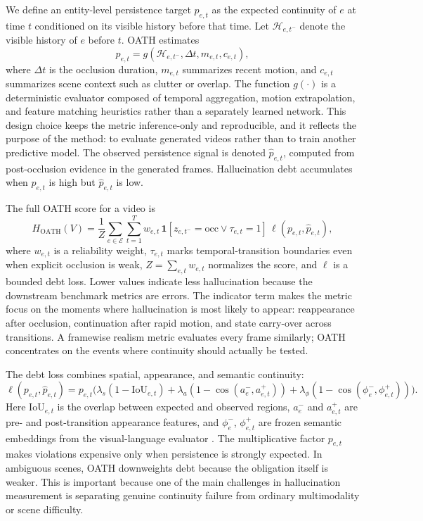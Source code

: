 \documentclass{article}
\begin{document}
We define an entity-level persistence target \(p_{e,t}\) as the expected continuity of \(e\) at time \(t\) conditioned on its visible history before that time. Let \(\mathcal{H}_{e,t^-}\) denote the visible history of \(e\) before \(t\). OATH estimates
\[
p_{e,t}=g(\mathcal{H}_{e,t^-}, \Delta t, m_{e,t}, c_{e,t}),
\]
where \(\Delta t\) is the occlusion duration, \(m_{e,t}\) summarizes recent motion, and \(c_{e,t}\) summarizes scene context such as clutter or overlap. The function \(g(\cdot)\) is a deterministic evaluator composed of temporal aggregation, motion extrapolation, and feature matching heuristics rather than a separately learned network. This design choice keeps the metric inference-only and reproducible, and it reflects the purpose of the method: to evaluate generated videos rather than to train another predictive model. The observed persistence signal is denoted \(\hat{p}_{e,t}\), computed from post-occlusion evidence in the generated frames. Hallucination debt accumulates when \(p_{e,t}\) is high but \(\hat{p}_{e,t}\) is low.

The full OATH score for a video is
\[
H_{\mathrm{OATH}}(V)=\frac{1}{Z}\sum_{e \in \mathcal{E}}\sum_{t=1}^{T} w_{e,t}\,\mathbf{1}[z_{e,t^-}=\mathrm{occ}\lor \tau_{e,t}=1]\,\ell(p_{e,t},\hat{p}_{e,t}),
\]
where \(w_{e,t}\) is a reliability weight, \(\tau_{e,t}\) marks temporal-transition boundaries even when explicit occlusion is weak, \(Z=\sum_{e,t}w_{e,t}\) normalizes the score, and \(\ell\) is a bounded debt loss. Lower values indicate less hallucination because the downstream benchmark metrics are errors. The indicator term makes the metric focus on the moments where hallucination is most likely to appear: reappearance after occlusion, continuation after rapid motion, and state carry-over across transitions. A framewise realism metric evaluates every frame similarly; OATH concentrates on the events where continuity should actually be tested.

The debt loss combines spatial, appearance, and semantic continuity:
\[
\ell(p_{e,t},\hat{p}_{e,t})=p_{e,t}\Big(\lambda_s(1-\mathrm{IoU}_{e,t})+\lambda_a(1-\cos(a^-_e,a^+_{e,t}))+\lambda_\phi(1-\cos(\phi^-_e,\phi^+_{e,t}))\Big).
\]
Here \(\mathrm{IoU}_{e,t}\) is the overlap between expected and observed regions, \(a^-_e\) and \(a^+_{e,t}\) are pre- and post-transition appearance features, and \(\phi^-_e\), \(\phi^+_{e,t}\) are frozen semantic embeddings from the visual-language evaluator \cite{clip2021,blip2_2023}. The multiplicative factor \(p_{e,t}\) makes violations expensive only when persistence is strongly expected. In ambiguous scenes, OATH downweights debt because the obligation itself is weaker. This is important because one of the main challenges in hallucination measurement is separating genuine continuity failure from ordinary multimodality or scene difficulty.
\end{document}
